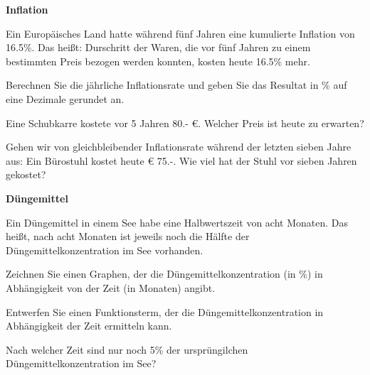 
\bbwActAufgabenNr{} \textbf{Inflation}

 Ein Europäisches Land hatte während fünf Jahren eine kumulierte
 Inflation von 16.5\%. Das heißt: Durschritt der Waren, die vor fünf Jahren zu einem
 bestimmten Preis bezogen werden konnten, kosten heute 16.5\% mehr.
 
\begin{bbwAufgabenBlock}

\item Berechnen Sie die jährliche Inflationsrate und geben Sie das
  Resultat in \% auf eine Dezimale gerundet an.


    \item Eine Schubkarre kostete vor 5 Jahren 80.- \euro{}. Welcher
      Preis ist heute zu erwarten?

    \item Gehen wir von gleichbleibender Inflationsrate während der
      letzten sieben Jahre aus: Ein Bürostuhl kostet heute \euro{}
      75.-. Wie viel hat der Stuhl vor sieben Jahren gekostet?

      
\end{bbwAufgabenBlock}
\platzFuerBerechnungenBisEndeSeite{}



\bbwActAufgabenNr{} \textbf{Düngemittel}

Ein Düngemittel in einem See habe eine Halbwertszeit von acht
Monaten. Das heißt, nach acht Monaten ist jeweils noch die Hälfte der
Düngemittelkonzentration im See vorhanden.

\begin{bbwAufgabenBlock}

\item Zeichnen Sie einen Graphen, der die Düngemittelkonzentration (in \%)
  in Abhängigkeit von der Zeit (in Monaten) angibt.


  
    \item Entwerfen Sie einen Funktionsterm, der die
      Düngemittelkonzentration in Abhängigkeit der Zeit ermitteln
      kann.


    \item Nach welcher Zeit sind nur noch 5\% der ursprüngilchen
      Düngemittelkonzentration im See?

      
\end{bbwAufgabenBlock}
\platzFuerBerechnungenBisEndeSeite{}





\newpage
